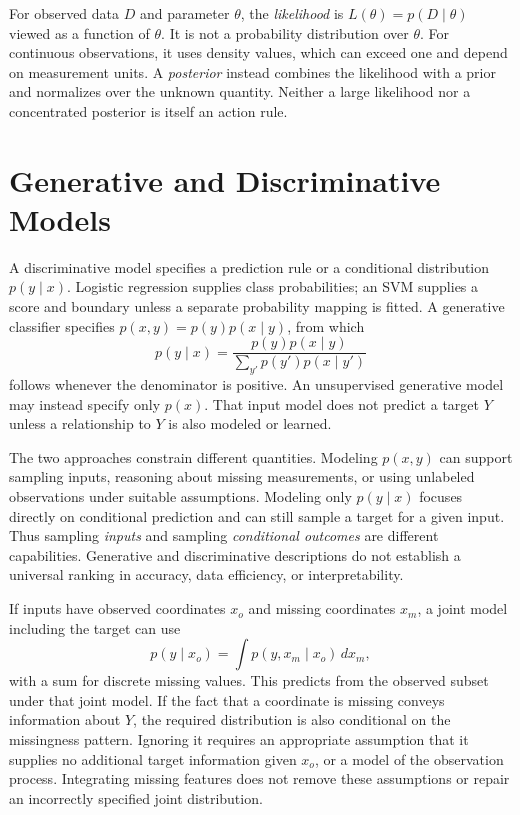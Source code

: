 For observed data $D$ and parameter $\theta$, the \emph{likelihood} is $L(\theta)=p(D\mid\theta)$ viewed as a function of $\theta$. It is not a probability distribution over $\theta$. For continuous observations, it uses density values, which can exceed one and depend on measurement units. A \emph{posterior} instead combines the likelihood with a prior and normalizes over the unknown quantity. Neither a large likelihood nor a concentrated posterior is itself an action rule.

\section{Generative and Discriminative Models}
\label{sec:gen-vs-disc}

A discriminative model specifies a prediction rule or a conditional distribution $p(y\mid x)$. Logistic regression supplies class probabilities; an SVM supplies a score and boundary unless a separate probability mapping is fitted. A generative classifier specifies $p(x,y)=p(y)p(x\mid y)$, from which
\[
p(y\mid x)=\frac{p(y)p(x\mid y)}{\sum_{y'}p(y')p(x\mid y')}
\]
follows whenever the denominator is positive. An unsupervised generative model may instead specify only $p(x)$. That input model does not predict a target $Y$ unless a relationship to $Y$ is also modeled or learned.

The two approaches constrain different quantities. Modeling $p(x,y)$ can support sampling inputs, reasoning about missing measurements, or using unlabeled observations under suitable assumptions. Modeling only $p(y\mid x)$ focuses directly on conditional prediction and can still sample a target for a given input. Thus sampling \emph{inputs} and sampling \emph{conditional outcomes} are different capabilities. Generative and discriminative descriptions do not establish a universal ranking in accuracy, data efficiency, or interpretability.

If inputs have observed coordinates $x_o$ and missing coordinates $x_m$, a joint model including the target can use
\[
p(y\mid x_o)=\int p(y,x_m\mid x_o)\,dx_m,
\]
with a sum for discrete missing values. This predicts from the observed subset under that joint model. If the fact that a coordinate is missing conveys information about $Y$, the required distribution is also conditional on the missingness pattern. Ignoring it requires an appropriate assumption that it supplies no additional target information given $x_o$, or a model of the observation process. Integrating missing features does not remove these assumptions or repair an incorrectly specified joint distribution.

